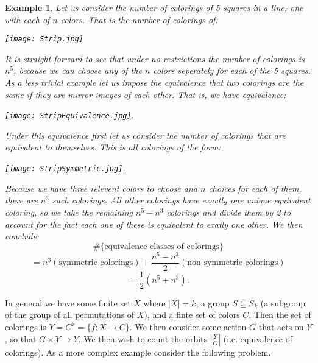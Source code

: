 \documentclass[11pt]{article}
\newtheorem{example}[theorem]{Example}
\begin{document}
\begin{example}

Let us consider the number of colorings of 5 squares in a line, one with each of $n$ colors. That is the number of colorings of:

\begin{center}
 \texttt{[image: Strip.jpg]}
\end{center}

It is straight forward to see that under no restrictions the number of colorings is $n^5$, because we can choose any of the $n$ colors seperately for each of the 5 squares. As a less trivial example let us impose the equivalence that two colorings are the same if they are mirror images of each other. That is, we have equivalence:

\begin{center}
 \texttt{[image: StripEquivalence.jpg]}.
\end{center}

Under this equivalence first let us consider the number of colorings that are equivalent to themselves. This is all colorings of the form:

\begin{center}
 \texttt{[image: StripSymmetric.jpg]}.
\end{center}

Because we have three relevent colors to choose and $n$ choices for each of them, there are $n^3$ such colorings. All other colorings have exactly one unique equivalent coloring, so we take the remaining $n^5 - n^3$ colorings and divide them by 2 to account for the fact each one of these is equivalent to exatly one other. We then conclude:
	\[ \# \{\mbox{equivalence classes of colorings} \} \]
	\[ = n^3 (\mbox{symmetric colorings}) + \frac{n^5 - n^3}{2} (\mbox{non-symmetric colorings}) \]
	\[ =\frac{1}{2}(n^5+n^3) .\]
\end{example}

In general we have some finite set $X$ where $|X|=k$, a group $S\subseteq S_k$ (a subgroup of the group of all permutations of $X$), and a finte set of colors $C$. Then the set of colorings is $Y=C^x = \{f: X \rightarrow C\}$. We then consider some action $G$ that acts on $Y$, so that $G \times Y \rightarrow Y$. We then wish to count the orbits $|\frac{Y}{G}|$ (i.e. equivalence of colorings). As a more complex example consider the following problem.
\end{document}
